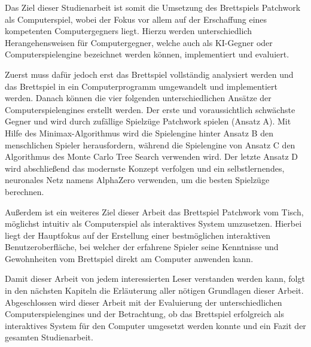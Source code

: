 Das Ziel dieser Studienarbeit ist somit die Umsetzung des Brettspiels Patchwork als Computerspiel, wobei der Fokus vor allem auf der Erschaffung eines kompetenten Computergegners liegt. Hierzu werden unterschiedlich Herangehensweisen für Computergegner, welche auch als \ac{KI}-Gegner oder Computerspielengine bezeichnet werden können, implementiert und evaluiert.

Zuerst muss dafür jedoch erst das Brettspiel vollständig analysiert werden und das Brettspiel in ein Computerprogramm umgewandelt und implementiert werden. Danach können die vier folgenden unterschiedlichen Ansätze der Computerspielengines erstellt werden. Der erste und voraussichtlich schwächste Gegner und wird durch zufällige Spielzüge Patchwork spielen (Ansatz A). Mit Hilfe des Minimax-Algorithmus wird die Spielengine hinter Ansatz B den menschlichen Spieler herausfordern, während die Spielengine von Ansatz C den Algorithmus des Monte Carlo Tree Search verwenden wird. Der letzte Ansatz D wird abschließend das modernste Konzept verfolgen und ein selbstlernendes, neuronales Netz namens AlphaZero verwenden, um die besten Spielzüge berechnen.

Außerdem ist ein weiteres Ziel dieser Arbeit das Brettspiel Patchwork vom Tisch, möglichst intuitiv als Computerspiel als interaktives System umzusetzen. Hierbei liegt der Hauptfokus auf der Erstellung einer bestmöglichen interaktiven Benutzeroberfläche, bei welcher der erfahrene Spieler seine Kenntnisse und Gewohnheiten vom Brettspiel direkt am Computer anwenden kann.

Damit dieser Arbeit von jedem interessierten Leser verstanden werden kann, folgt in den nächsten Kapiteln die Erläuterung aller nötigen Grundlagen dieser Arbeit. Abgeschlossen wird dieser Arbeit mit der Evaluierung der unterschiedlichen Computerspielengines und der Betrachtung, ob das Brettspiel erfolgreich als interaktives System für den Computer umgesetzt werden konnte und ein Fazit der gesamten Studienarbeit.
